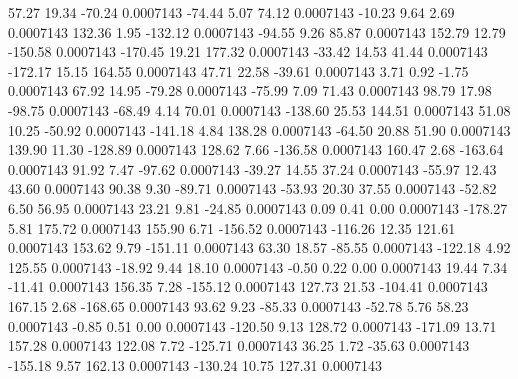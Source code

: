        57.27       19.34      -70.24     0.0007143
      -74.44        5.07       74.12     0.0007143
      -10.23        9.64        2.69     0.0007143
      132.36        1.95     -132.12     0.0007143
      -94.55        9.26       85.87     0.0007143
      152.79       12.79     -150.58     0.0007143
     -170.45       19.21      177.32     0.0007143
      -33.42       14.53       41.44     0.0007143
     -172.17       15.15      164.55     0.0007143
       47.71       22.58      -39.61     0.0007143
        3.71        0.92       -1.75     0.0007143
       67.92       14.95      -79.28     0.0007143
      -75.99        7.09       71.43     0.0007143
       98.79       17.98      -98.75     0.0007143
      -68.49        4.14       70.01     0.0007143
     -138.60       25.53      144.51     0.0007143
       51.08       10.25      -50.92     0.0007143
     -141.18        4.84      138.28     0.0007143
      -64.50       20.88       51.90     0.0007143
      139.90       11.30     -128.89     0.0007143
      128.62        7.66     -136.58     0.0007143
      160.47        2.68     -163.64     0.0007143
       91.92        7.47      -97.62     0.0007143
      -39.27       14.55       37.24     0.0007143
      -55.97       12.43       43.60     0.0007143
       90.38        9.30      -89.71     0.0007143
      -53.93       20.30       37.55     0.0007143
      -52.82        6.50       56.95     0.0007143
       23.21        9.81      -24.85     0.0007143
        0.09        0.41        0.00     0.0007143
     -178.27        5.81      175.72     0.0007143
      155.90        6.71     -156.52     0.0007143
     -116.26       12.35      121.61     0.0007143
      153.62        9.79     -151.11     0.0007143
       63.30       18.57      -85.55     0.0007143
     -122.18        4.92      125.55     0.0007143
      -18.92        9.44       18.10     0.0007143
       -0.50        0.22        0.00     0.0007143
       19.44        7.34      -11.41     0.0007143
      156.35        7.28     -155.12     0.0007143
      127.73       21.53     -104.41     0.0007143
      167.15        2.68     -168.65     0.0007143
       93.62        9.23      -85.33     0.0007143
      -52.78        5.76       58.23     0.0007143
       -0.85        0.51        0.00     0.0007143
     -120.50        9.13      128.72     0.0007143
     -171.09       13.71      157.28     0.0007143
      122.08        7.72     -125.71     0.0007143
       36.25        1.72      -35.63     0.0007143
     -155.18        9.57      162.13     0.0007143
     -130.24       10.75      127.31     0.0007143
